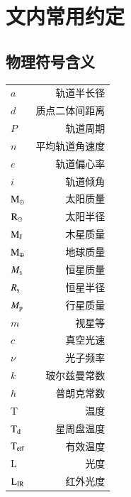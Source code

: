 
\chapter{文内常用约定} \label{apdx:nomenclature}
\section{物理符号含义} \label{apdx:symbol}
\begin{multicols}{2}
\begin{tabularx}{0.85\linewidth}{@{\extracolsep{\fill}}lr}
\centering
$a$      	     			&     轨道半长径 		\\
$d$      	     			&     质点二体间距离	 	\\
$P$      	     			&     轨道周期	 		\\
$n$      	     			&     平均轨道角速度	 	\\
$e$      	     			&     轨道偏心率 		\\
$i$          	     			&     轨道倾角 			\\
$\mathrm{M}_\odot$          		&     太阳质量   			\\
$\mathrm{R}_\odot$          		&     太阳半径   			\\
$\mathrm{M}_\mathrm{J}$          		&     木星质量   			\\
$\mathrm{M}_\oplus$          	&     地球质量   			\\
$M_\mathrm{s}$          		&     恒星质量   			\\
$R_\mathrm{s}$          		&     恒星半径   			\\
$M_\mathrm{p}$         	 	&     行星质量   			\\
$m$         	 			&     视星等   			\\
$c$         	 			&     真空光速   			\\
$\nu$         	 		&     光子频率   			\\
$k$         	 			&     玻尔兹曼常数   		\\
$h$         	 			&     普朗克常数   		\\
T		       	 		&     温度   			\\
$\mathrm{T}_\mathrm{d}$         	 	&     星周盘温度   		\\
$\mathrm{T}_\mathrm{eff}$         	 	&     有效温度 	  		\\
L		         	 	&     光度				\\
$\mathrm{L}_\mathrm{IR}$         	 	&      红外光度   		\\


\end{tabularx}
\end{multicols}

